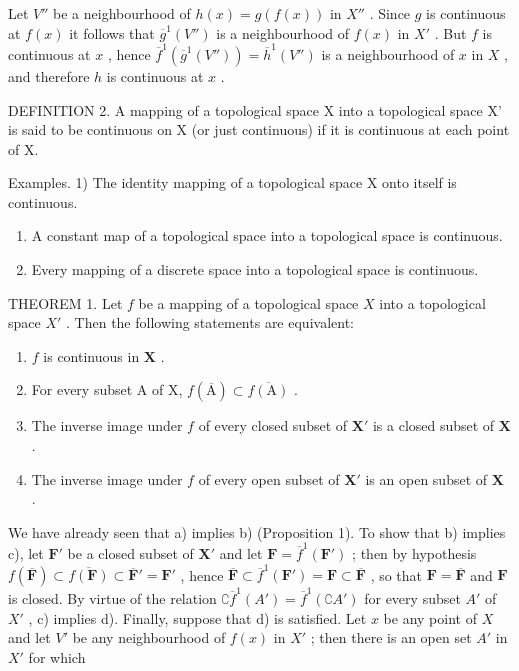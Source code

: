 Let \(V''\) be a neighbourhood of \(h(x) = g(f(x))\) in \(X''\) . Since \(g\) is continuous at \(f(x)\) it follows that \(\overline{g}^1(V'')\) is a neighbourhood of \(f(x)\) in \(X'\) . But \(f\) is continuous at \(x\) , hence \(\overline{f}^1(\overline{g}^1(V'')) = \overline{h}^1(V'')\) is a neighbourhood of \(x\) in \(X\) , and therefore \(h\) is continuous at \(x\) .

DEFINITION 2. A mapping of a topological space X into a topological space X' is said to be continuous on X (or just continuous) if it is continuous at each point of X.

Examples. 1) The identity mapping of a topological space X onto itself is continuous.

\begin{enumerate}
\def\labelenumi{\arabic{enumi})}
\setcounter{enumi}{1}
\item
  A constant map of a topological space into a topological space is continuous.
\item
  Every mapping of a discrete space into a topological space is continuous.
\end{enumerate}

THEOREM 1. Let \(f\) be a mapping of a topological space \(X\) into a topological space \(X'\) . Then the following statements are equivalent:

\begin{enumerate}
\def\labelenumi{\alph{enumi})}
\item
  \(f\) is continuous in \(\mathbf{X}\) .
\item
  For every subset A of X, \(f(\overline{\mathrm{A}}) \subset \overline{f(\mathrm{A})}\) .
\item
  The inverse image under \(f\) of every closed subset of \(\mathbf{X}'\) is a closed subset of \(\mathbf{X}\) .
\item
  The inverse image under \(f\) of every open subset of \(\mathbf{X}'\) is an open subset of \(\mathbf{X}\) .
\end{enumerate}

We have already seen that a) implies b) (Proposition 1). To show that b) implies c), let \(\mathbf{F}'\) be a closed subset of \(\mathbf{X}'\) and let \(\mathbf{F} = \overline{f}^{1}(\mathbf{F}')\) ; then by hypothesis \(f(\overline{\mathbf{F}}) \subset \overline{f(\mathbf{F})} \subset \overline{\mathbf{F}}' = \mathbf{F}'\) , hence \(\overline{\mathbf{F}} \subset \overline{f}^{1}(\mathbf{F}') = \mathbf{F} \subset \overline{\mathbf{F}}\) , so that \(\mathbf{F} = \overline{\mathbf{F}}\) and \(\mathbf{F}\) is closed. By virtue of the relation \(\complement \overline{f}^{1}(A') = \overline{f}^{1}(\complement A')\) for every subset \(A'\) of \(X'\) , c) implies d). Finally, suppose that d) is satisfied. Let \(x\) be any point of \(X\) and let \(V'\) be any neighbourhood of \(f(x)\) in \(X'\) ; then there is an open set \(A'\) in \(X'\) for which

